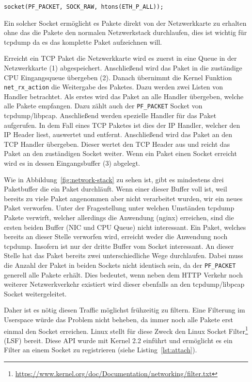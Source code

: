 \begin{lstlisting}[caption={Erzeugen eines \texttt{PF\_PACKET} Sockets},label=lst:pfpacket]
socket(PF_PACKET, SOCK_RAW, htons(ETH_P_ALL));
\end{lstlisting}


Ein solcher Socket ermöglicht es Pakete direkt von der Netzwerkkarte zu
erhalten ohne das die Pakete den normalen Netzwerkstack durchlaufen, dies ist
wichtig für tcpdump da es das komplette Paket aufzeichnen will.

Erreicht ein TCP Paket die Netzwerkkarte wird es zuerst in eine Queue in der
Netzwerkkarte (1) abgespeichert. Anschließend wird das Paket in die zuständige
CPU Eingangsqueue übergeben (2). Danach übernimmt die Kernel Funktion
\texttt{net\_rx\_action} die Weitergabe des Paketes. Dazu werden zwei Listen
von Handler betrachtet. Als erstes wird das Paket an alle Handler übergeben,
welche alle Pakete empfangen. Dazu zählt auch der \texttt{PF\_PACKET} Socket
von tcpdump/libpcap. Anschließend werden spezielle Handler für das Paket
aufgerufen. In dem Fall eines TCP Paketes ist dies der IP Handler, welcher den
IP Header liest, auswertet und entfernt.  Anschließend wird das Paket an den
TCP Handler übergeben. Dieser wertet den TCP Header aus und reicht das Paket an
den zuständigen Socket weiter. Wenn ein Paket einen Socket erreicht wird es in
dessen Eingangsbuffer (3) abgelegt.

Wie in Abbildung~\ref{fig:network-stack} zu sehen ist, gibt es mindestens drei
Paketbuffer die ein Paket durchläuft. Wenn einer dieser Buffer voll ist, weil
bereits zu viele Paket angenommen aber nicht verarbeitet wurden, wir ein neues
Paket verworfen. Unter der Fragestellung unter welchen Umständen tcpdump Pakete
verwirft, welcher allerdings die Anwendung (nginx) erreichen, sind die ersten
beiden Buffer (NIC und CPU Queue) nicht interessant. Ein Paket, welches bereits
an dieser Stelle verworfen wird, erreicht weder die Anwendung noch tcpdump.
Insofern ist nur der dritte Buffer vom Socket interessant. An dieser Stelle hat
das Paket bereits zwei unterschiedliche Wege durchlaufen. Dabei muss die Anzahl
der Paket in beiden Sockets nicht identisch sein, da der \texttt{PF\_PACKET}
generell alle Pakete erhält. Dies bedeutet, wenn neben dem HTTP Verkehr noch
weiterer Netzwerkverkehr existiert wird dieser ebenfalls an den tcpdump/libpcap
Socket weitergeleitet.

Daher ist es nötig diesen Traffic möglichst frühzeitig zu filtern. Eine
Filterung im Userspace würde das Problem nicht beheben, da immer noch alle
Pakete erst einmal den Socket erreichen. Linux stellt für diese Zweck den Linux
Socket
Filter\footnote{\url{https://www.kernel.org/doc/Documentation/networking/filter.txt}}
(LSF) bereit. Diese API wurde mit Kernel 2.2 einführt und ermöglicht es ein Filter
an einem Socket zu registrieren (siehe Listing~\ref{lst:attach}).

